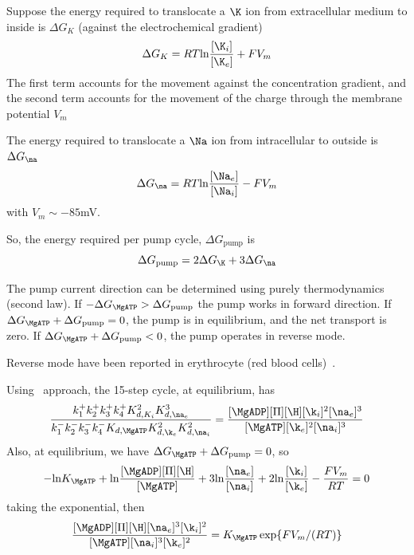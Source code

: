 Suppose the energy required to translocate a $\K$ ion from
extracellular medium to inside is $\Delta G_K$ (against the
electrochemical gradient)
\begin{equation}
  \label{eq:1180}
  \Delta G_K = RT \ln \frac{[\K_i]}{[\K_e]} + FV_m
\end{equation}
The first term accounts for the movement against the concentration
gradient, and the second term accounts for the movement of the charge
through the membrane potential $V_m$

The energy required to translocate a $\Na$ ion from intracellular to
outside is $\Delta G_\na$
\begin{equation}
  \label{eq:1181}
  \Delta G_\na = RT \ln \frac{[\Na_e]}{[\Na_i]} - FV_m
\end{equation}
with $V_m \sim -85$mV. 

So, the energy required per pump cycle, $\Delta G_\text{pump}$ is
\begin{equation}
  \label{eq:1182}
  \Delta G_\text{pump} = 2\Delta G_\K + 3\Delta G_\na
\end{equation}
\begin{framed}
  The pump current direction can be determined using purely
  thermodynamics (second law). If $-\Delta G_\MgATP > \Delta
  G_\text{pump}$ the pump works in forward direction. If $\Delta
  G_\MgATP + \Delta G_\text{pump} = 0$, the pump is in equilibrium,
  and the net transport is zero. If $\Delta G_\MgATP + \Delta
  G_\text{pump} < 0$, the pump operates in reverse mode.

  Reverse mode have been reported in erythrocyte (red blood
  cells)~\citep{lew1970}. 
\end{framed}

Using~\citep{hill1989} approach, the 15-step cycle, at equilibrium,
has
\begin{equation}
  \label{eq:1186}
  \frac{k^+_1k^+_2k^+_3k^+_4K^2_{d,K_i}K^3_{d,\na_e}}{k^-_1k^-_2k^-_3k^-_4K_{d,\MgATP}K^2_{d,\k_e}K^2_{d,\na_i}}
  = \frac{[\MgADP][\Pi][\H][\k_i]^2[\na_e]^3}{[\MgATP][\k_e]^2[\na_i]^3}
\end{equation}
Also, at equilibrium, we have $\Delta G_\MgATP + \Delta G_\text{pump}
= 0$, so
\begin{equation}
  \label{eq:1187}
  -\ln K_\MgATP + \ln \frac{[\MgADP][\Pi][\H]}{[\MgATP]} + 3\ln
  \frac{[\na_e]}{[\na_i]} + 2 \ln
  \frac{[\k_i]}{[\k_e]}-\frac{FV_m}{RT}  = 0
\end{equation}
taking the exponential, then 
\begin{equation}
  \label{eq:1188}
  \frac{[\MgADP][\Pi][\H][\na_e]^3[\k_i]^2}{[\MgATP][\na_i]^3[\k_e]^2}   =  K_\MgATP\exp\{FV_m/(RT)\}
\end{equation}

